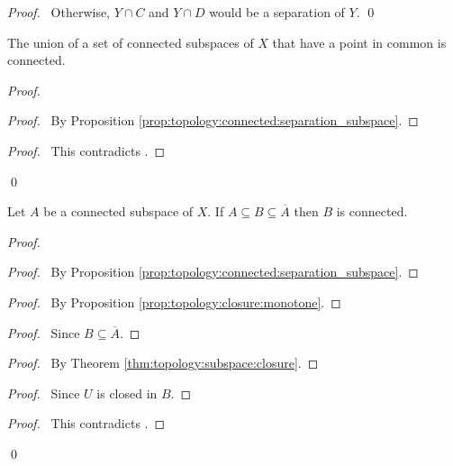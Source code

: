 \begin{proof}
  \pf\ Otherwise, $Y \cap C$ and $Y \cap D$ would be a separation of $Y$. \qed
\end{proof}

\begin{prop}
  \label{prop:topology:connected:union}
  The union of a set of connected subspaces of $X$ that have a point in
  common
  is connected.
\end{prop}

\begin{proof}
  \pf
  \begin{proof}
    \pf\ By Proposition \ref{prop:topology:connected:separation_subspace}.
  \end{proof}
  \qedstep
  \begin{proof}
    \pf\ This contradicts .
  \end{proof}
  \qed
\end{proof}

\begin{thm}
  \label{thm:topology:connected:closure}
  Let $A$ be a connected subspace of $X$. If $A \subseteq B \subseteq
  \overline{A}$ then $B$ is connected.
\end{thm}

\begin{proof}
  \pf
  \begin{proof}
    \pf\ By Proposition \ref{prop:topology:connected:separation_subspace}.
  \end{proof}
  \begin{proof}
    \pf\ By Proposition \ref{prop:topology:closure:monotone}.
  \end{proof}
  \begin{proof}
    \pf\ Since $B \subseteq \overline{A}$.
  \end{proof}
  \begin{proof}
    \pf\ By Theorem \ref{thm:topology:subspace:closure}.
  \end{proof}
  \begin{proof}
    \pf\ Since $U$ is closed in $B$.
  \end{proof}
  \qedstep
  \begin{proof}
    \pf\ This contradicts .
  \end{proof}
  \qed
\end{proof}

